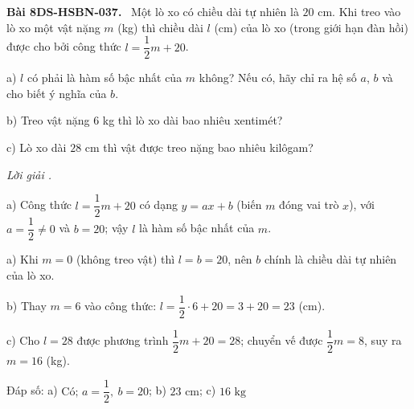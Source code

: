 \documentclass[12pt,a4paper]{article}
\newenvironment{problem}[1][]{\par\medskip\noindent\textbf{Bài #1.}\ }{\par}
\newenvironment{solution}[1][]{\par\noindent\textit{Lời giải #1.}\par}{\par}
\begin{document}
\begin{problem}[8DS-HSBN-037]
Một lò xo có chiều dài tự nhiên là $20$ cm. Khi treo vào lò xo một vật nặng $m$ (kg) thì chiều dài $l$ (cm) của lò xo (trong giới hạn đàn hồi) được cho bởi công thức $l = \dfrac{1}{2}m + 20$.

a) $l$ có phải là hàm số bậc nhất của $m$ không? Nếu có, hãy chỉ ra hệ số $a$, $b$ và cho biết ý nghĩa của $b$.

b) Treo vật nặng $6$ kg thì lò xo dài bao nhiêu xentimét?

c) Lò xo dài $28$ cm thì vật được treo nặng bao nhiêu kilôgam?

\begin{solution}
a) Công thức $l = \dfrac{1}{2}m + 20$ có dạng $y = ax + b$ (biến $m$ đóng vai trò $x$), với $a = \dfrac{1}{2} \neq 0$ và $b = 20$; vậy $l$ là hàm số bậc nhất của $m$.

a) Khi $m = 0$ (không treo vật) thì $l = b = 20$, nên $b$ chính là chiều dài tự nhiên của lò xo.

b) Thay $m = 6$ vào công thức: $l = \dfrac{1}{2} \cdot 6 + 20 = 3 + 20 = 23$ (cm).

c) Cho $l = 28$ được phương trình $\dfrac{1}{2}m + 20 = 28$; chuyển vế được $\dfrac{1}{2}m = 8$, suy ra $m = 16$ (kg).

Đáp số: a) $\boxed{\text{Có; } a = \dfrac{1}{2},\ b = 20}$; b) $\boxed{23 \text{ cm}}$; c) $\boxed{16 \text{ kg}}$
\end{solution}
\end{problem}
\end{document}
